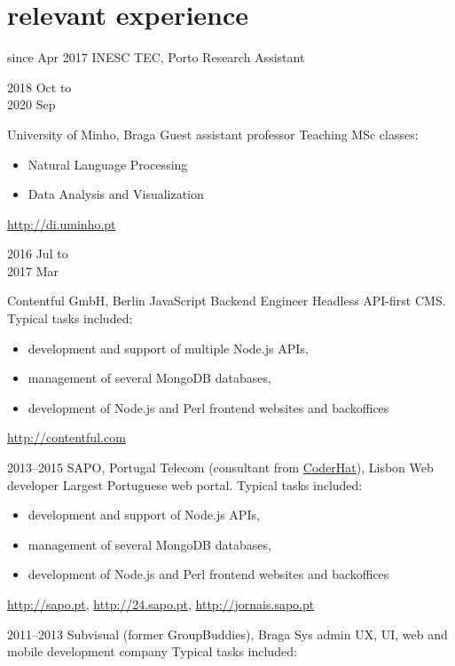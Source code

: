 \documentclass[a4paper]{friggeri-cv}
\begin{document}
\section{relevant experience}
\begin{entrylist}
  \entry
    {{\tiny since} Apr 2017}
    {INESC TEC, Porto}
    {Research Assistant}
    {\vspace{-0.7cm}}
    {}
  \entry
    {\parbox[t][][t]{1.8cm}{2018 {\footnotesize Oct to}\\2020
    {\footnotesize Sep}}}
    {University of Minho, Braga}
    {Guest assistant professor}
    {Teaching MSc classes:}
    {\begin{itemize}
        \item Natural Language Processing
        \item Data Analysis and Visualization
    \end{itemize}
    \url{http://di.uminho.pt}
    }
  \entry
    {\parbox[t][][t]{1.8cm}{2016 {\footnotesize Jul to}\\2017 {\footnotesize Mar}}}
    {Contentful GmbH, Berlin}
    {JavaScript Backend Engineer}
    {Headless API-first CMS. \footnotesize{Typical tasks
    included:}}
    {\begin{itemize}
        \item development and support of multiple Node.js APIs,
        \item management of several MongoDB databases,
        \item development of Node.js and Perl frontend websites and backoffices
    \end{itemize}
    \url{http://contentful.com}
    }
  \entry
    {2013--2015}
    {SAPO, Portugal Telecom (consultant from \href{http://www.coderhat.com/}{CoderHat}), Lisbon}
    {Web developer}
    {Largest Portuguese web portal. \footnotesize{Typical tasks
    included:}}
    {\begin{itemize}
        \item development and support of Node.js APIs,
        \item management of several MongoDB databases,
        \item development of Node.js and Perl frontend websites and backoffices
    \end{itemize}
    \url{http://sapo.pt}, \url{http://24.sapo.pt}, \url{http://jornais.sapo.pt}
    }
  \entry
    {2011--2013}
    {Subvisual (former GroupBuddies), Braga}
    {Sys admin}
    {UX, UI, web and mobile development company}
    {Typical tasks included:
}
\end{entrylist}
\end{document}
